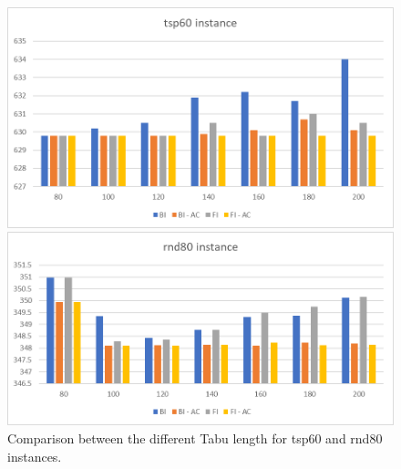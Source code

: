	
	\begin{figure}[p]
		\centering
		\includegraphics[width=\linewidth]{img/TS-calibration-tsp60}
	
	\vspace{2cm}
	
		\includegraphics[width=\linewidth]{img/TS-calibration-rnd80}
		\caption{Comparison between the different Tabu length for tsp60 and rnd80 instances.}
		\label{fig:ts-calibration-rnd80}
	\end{figure}


